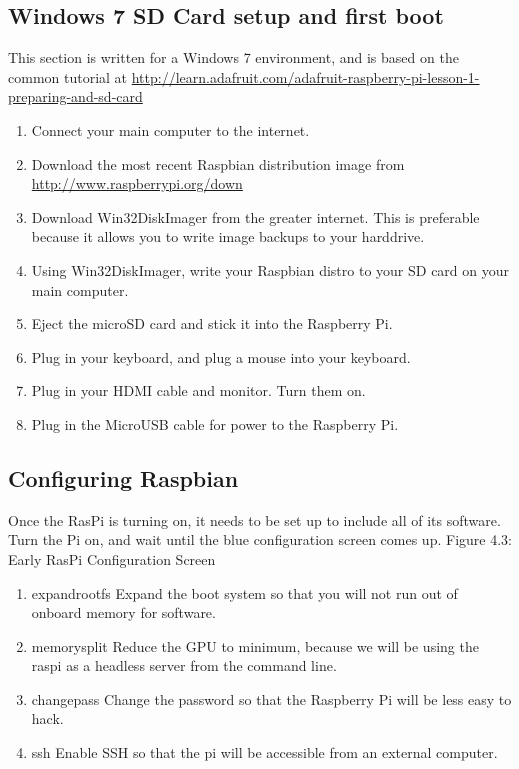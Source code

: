 \subsection{Windows 7 SD Card setup and first boot}
This section is written for a Windows 7 environment, and is based on the common tutorial at \url{http://learn.adafruit.com/adafruit-raspberry-pi-lesson-1-preparing-and-sd-card}
\begin{enumerate}
\item Connect your main computer to the internet.
\item Download the most recent Raspbian distribution image from \url{http://www.raspberrypi.org/down}
\item Download Win32DiskImager from the greater internet. This is preferable because it allows you to write image backups to your harddrive.
\item Using Win32DiskImager, write your Raspbian distro to your SD card on your main computer.
\item Eject the microSD card and stick it into the Raspberry Pi.
\item Plug in your keyboard, and plug a mouse into your keyboard.
\item Plug in your HDMI cable and monitor. Turn them on.
\item Plug in the MicroUSB cable for power to the Raspberry Pi.
\end{enumerate}


\subsection{Configuring Raspbian}
Once the RasPi is turning on, it needs to be set up to include all of its software. Turn the Pi on, and wait until the blue configuration screen comes up.
Figure 4.3: Early RasPi Configuration Screen

\begin{enumerate}
\item expandrootfs Expand the boot system so that you will not run out of onboard memory for software.
\item memorysplit Reduce the GPU to minimum, because we will be using the raspi as a headless server from the command line.
\item changepass Change the password so that the Raspberry Pi will be less easy to hack.
\item ssh Enable SSH so that the pi will be accessible from an external computer.
\end{enumerate}

